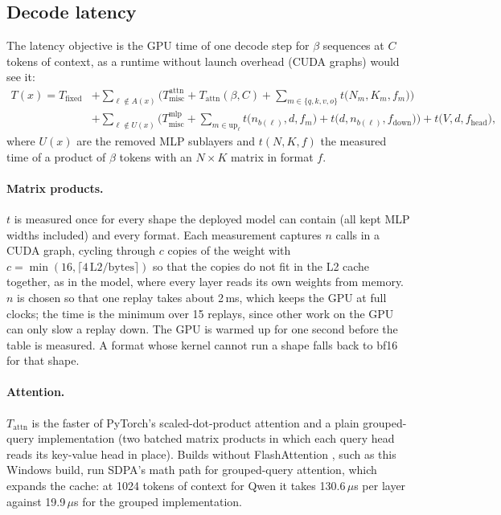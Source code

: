 \documentclass[11pt]{article}
\newcommand{\us}{\,$\mu$s}
\begin{document}
\subsection{Decode latency}
The latency objective is the GPU time of one decode step for $\beta$ sequences at $C$ tokens of
context, as a runtime without launch overhead (CUDA graphs) would see it:
\begin{equation}
\begin{aligned}
  T(x) = T_{\text{fixed}}
   &+ \sum_{\ell\notin A(x)}\Big(T^{\text{attn}}_{\text{misc}} + T_{\text{attn}}(\beta,C)
        + \sum_{m\in\{q,k,v,o\}} t\big(N_m,K_m,f_m\big)\Big) \\
   &+ \sum_{\ell\notin U(x)}\Big(T^{\text{mlp}}_{\text{misc}}
        + \sum_{m\in\text{up}_\ell} t\big(n_{b(\ell)},d,f_m\big) + t\big(d,n_{b(\ell)},f_{\text{down}}\big)\Big)
   + t\big(V,d,f_{\text{head}}\big),
\end{aligned}
\label{eq:latency}
\end{equation}
where $U(x)$ are the removed MLP sublayers and $t(N,K,f)$ the measured time of a product of $\beta$ tokens
with an $N\times K$ matrix in format $f$.

\paragraph{Matrix products.}
$t$ is measured once for every shape the deployed model can contain (all kept MLP widths included) and
every format. Each measurement captures $n$ calls in a CUDA graph, cycling through $c$ copies of the
weight with $c=\min(16,\lceil4\,\text{L2}/\text{bytes}\rceil)$ so that the copies do not fit in the L2
cache together, as in the model, where every layer reads its own weights from memory. $n$ is chosen so
that one replay takes about 2\,ms, which keeps the GPU at full clocks; the time is the minimum over 15
replays, since other work on the GPU can only slow a replay down. The GPU is warmed up for one second
before the table is measured. A format whose kernel cannot run a shape falls back to bf16 for that shape.

\paragraph{Attention.}
$T_{\text{attn}}$ is the faster of PyTorch's scaled-dot-product attention and a plain grouped-query
implementation (two batched matrix products in which each query head reads its key-value head in place).
Builds without FlashAttention \cite{dao2024flashattention2}, such as this Windows build, run SDPA's math
path for grouped-query attention, which expands the cache: at 1024 tokens of context for Qwen it takes
130.6\us{} per layer against 19.9\us{} for the grouped implementation.
\end{document}
